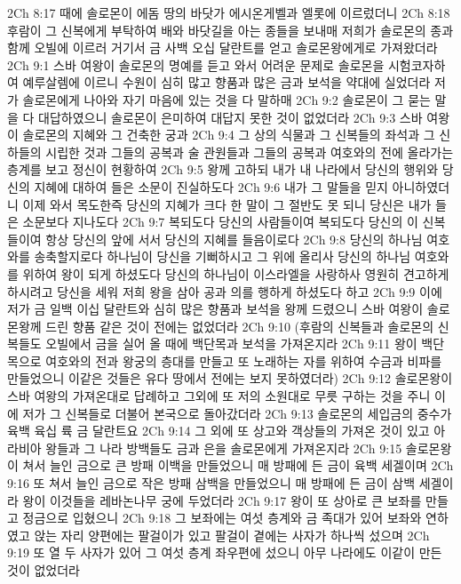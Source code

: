 2Ch 8:17  때에 솔로몬이 에돔 땅의 바닷가 에시온게벨과 엘롯에 이르렀더니
2Ch 8:18  후람이 그 신복에게 부탁하여 배와 바닷길을 아는 종들을 보내매 저희가 솔로몬의 종과 함께 오빌에 이르러 거기서 금 사백 오십 달란트를 얻고 솔로몬왕에게로 가져왔더라
2Ch 9:1  스바 여왕이 솔로몬의 명예를 듣고 와서 어려운 문제로 솔로몬을 시험코자하여 예루살렘에 이르니 수원이 심히 많고 향품과 많은 금과 보석을 약대에 실었더라 저가 솔로몬에게 나아와 자기 마음에 있는 것을 다 말하매
2Ch 9:2  솔로몬이 그 묻는 말을 다 대답하였으니 솔로몬이 은미하여 대답지 못한 것이 없었더라
2Ch 9:3  스바 여왕이 솔로몬의 지혜와 그 건축한 궁과
2Ch 9:4  그 상의 식물과 그 신복들의 좌석과 그 신하들의 시립한 것과 그들의 공복과 술 관원들과 그들의 공복과 여호와의 전에 올라가는 층계를 보고 정신이 현황하여
2Ch 9:5  왕께 고하되 내가 내 나라에서 당신의 행위와 당신의 지혜에 대하여 들은 소문이 진실하도다
2Ch 9:6  내가 그 말들을 믿지 아니하였더니 이제 와서 목도한즉 당신의 지혜가 크다 한 말이 그 절반도 못 되니 당신은 내가 들은 소문보다 지나도다
2Ch 9:7  복되도다 당신의 사람들이여 복되도다 당신의 이 신복들이여 항상 당신의 앞에 서서 당신의 지혜를 들음이로다
2Ch 9:8  당신의 하나님 여호와를 송축할지로다 하나님이 당신을 기뻐하시고 그 위에 올리사 당신의 하나님 여호와를 위하여 왕이 되게 하셨도다 당신의 하나님이 이스라엘을 사랑하사 영원히 견고하게 하시려고 당신을 세워 저희 왕을 삼아 공과 의를 행하게 하셨도다 하고
2Ch 9:9  이에 저가 금 일백 이십 달란트와 심히 많은 향품과 보석을 왕께 드렸으니 스바 여왕이 솔로몬왕께 드린 향품 같은 것이 전에는 없었더라
2Ch 9:10  (후람의 신복들과 솔로몬의 신복들도 오빌에서 금을 실어 올 때에 백단목과 보석을 가져온지라
2Ch 9:11  왕이 백단목으로 여호와의 전과 왕궁의 층대를 만들고 또 노래하는 자를 위하여 수금과 비파를 만들었으니 이같은 것들은 유다 땅에서 전에는 보지 못하였더라)
2Ch 9:12  솔로몬왕이 스바 여왕의 가져온대로 답례하고 그외에 또 저의 소원대로 무릇 구하는 것을 주니 이에 저가 그 신복들로 더불어 본국으로 돌아갔더라
2Ch 9:13  솔로몬의 세입금의 중수가 육백 육십 륙 금 달란트요
2Ch 9:14  그 외에 또 상고와 객상들의 가져온 것이 있고 아라비아 왕들과 그 나라 방백들도 금과 은을 솔로몬에게 가져온지라
2Ch 9:15  솔로몬왕이 쳐서 늘인 금으로 큰 방패 이백을 만들었으니 매 방패에 든 금이 육백 세겔이며
2Ch 9:16  또 쳐서 늘인 금으로 작은 방패 삼백을 만들었으니 매 방패에 든 금이 삼백 세겔이라 왕이 이것들을 레바논나무 궁에 두었더라
2Ch 9:17  왕이 또 상아로 큰 보좌를 만들고 정금으로 입혔으니
2Ch 9:18  그 보좌에는 여섯 층계와 금 족대가 있어 보좌와 연하였고 앉는 자리 양편에는 팔걸이가 있고 팔걸이 곁에는 사자가 하나씩 섰으며
2Ch 9:19  또 열 두 사자가 있어 그 여섯 층계 좌우편에 섰으니 아무 나라에도 이같이 만든 것이 없었더라
